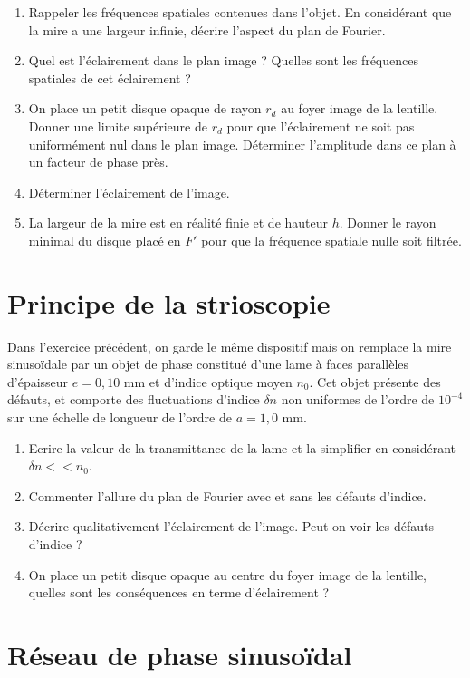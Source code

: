 \documentclass{article}
\begin{document}
\begin{enumerate}
  \item Rappeler les fréquences spatiales contenues dans l'objet. En considérant que la mire a une largeur infinie, décrire l'aspect du plan de Fourier. 
  \item Quel est l'éclairement dans le plan image ? Quelles sont les fréquences spatiales de cet éclairement ? 
  \item On place un petit disque opaque de rayon $r_d$ au foyer image de la lentille. Donner une limite supérieure de $r_d$ pour que l'éclairement ne soit pas uniformément nul dans le plan image. Déterminer l'amplitude dans ce plan à un facteur de phase près. 
  \item Déterminer l'éclairement de l'image. 
  \item La largeur de la mire est en réalité finie et de hauteur $h$. Donner le rayon minimal du disque placé en $F'$ pour que la fréquence spatiale nulle soit filtrée. 
  
\end{enumerate}

\section{Principe de la strioscopie}
Dans l'exercice précédent, on garde le même dispositif mais on remplace la mire sinusoïdale par un objet de phase constitué d'une lame à faces parallèles d'épaisseur $e=0,10$ mm et d'indice optique moyen $n_0$. 
Cet objet présente des défauts, et comporte des fluctuations d'indice $\delta n$ non uniformes de l'ordre de $10^{-4}$ sur une échelle de longueur de l'ordre de $a = 1,0 $ mm. 
\begin{enumerate}
  \item Ecrire la valeur de la transmittance de la lame et la simplifier en considérant $\delta n << n_0$.
  \item Commenter l'allure du plan de Fourier avec et sans les défauts d'indice. 
  \item Décrire qualitativement l'éclairement de l'image. Peut-on voir les défauts d'indice ? 
  \item On place un petit disque opaque au centre du foyer image de la lentille, quelles sont les conséquences en terme d'éclairement ? 
\end{enumerate}


\section{Réseau de phase sinusoïdal}
\end{document}
